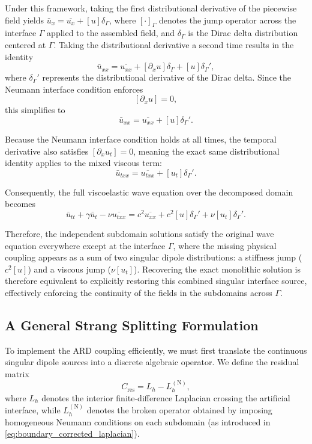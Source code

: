 \documentclass{Configuration_Files/PoliMi3i_thesis}
\begin{document}
Under this framework, taking the first distributional derivative of the piecewise field yields $\bar{u}_x = \overline{u_x} + [u]\delta_\Gamma$, where $[\cdot]_\Gamma$ denotes the jump operator across the interface $\Gamma$ applied to the assembled field, and $\delta_\Gamma$ is the Dirac delta distribution centered at $\Gamma$. Taking the distributional derivative a second time results in the identity
\[
\bar u_{xx}
=
\overline{u_{xx}}
+
[\partial_xu]\delta_\Gamma
+
[u]\delta_\Gamma',
\]
where $\delta_\Gamma'$ represents the distributional derivative of the Dirac delta. Since the Neumann interface condition enforces
\[
[\partial_xu]=0,
\]
this simplifies to
\begin{equation}
\bar u_{xx}
=
\overline{u_{xx}}
+
[u]\delta_\Gamma'.
\label{eq:dist_deriv}
\end{equation}

Because the Neumann interface condition holds at all times, the temporal derivative also satisfies $[\partial_x u_t]=0$, meaning the exact same distributional identity applies to the mixed viscous term:
\begin{equation*}
\bar u_{txx}
=
\overline{u_{txx}}
+
[u_t]\delta_\Gamma'.
\end{equation*}

Consequently, the full viscoelastic wave equation over the decomposed domain becomes
\begin{equation*}
\bar u_{tt}
+
\gamma\bar u_t
-
\nu\overline{u_{txx}}
=
c^2\overline{u_{xx}}
+
c^2[u]\delta_\Gamma'
+
\nu[u_t]\delta_\Gamma'.
\end{equation*}

Therefore, the independent subdomain solutions satisfy the original wave equation everywhere except at the interface $\Gamma$, where the missing physical coupling appears as a sum of two singular dipole distributions: a stiffness jump ($c^2[u]$) and a viscous jump ($\nu[u_t]$). Recovering the exact monolithic solution is therefore equivalent to explicitly restoring this combined singular interface source, effectively enforcing the continuity of the fields in the subdomains across $\Gamma$.

\subsection{A General Strang Splitting Formulation}
\label{subsec:ard_strang_splitting}

To implement the ARD coupling efficiently, we must first translate the continuous singular dipole sources into a discrete algebraic operator. We define the residual matrix
\begin{equation*}
C_{\mathrm{res}}
=
L_h
-
L_h^{(\mathrm N)},
\end{equation*}
where $L_h$ denotes the interior finite-difference Laplacian crossing the artificial interface, while $L_h^{(\mathrm N)}$ denotes the broken operator obtained by imposing homogeneous Neumann conditions on each subdomain (as introduced in \eqref{eq:boundary_corrected_laplacian}).
\end{document}
